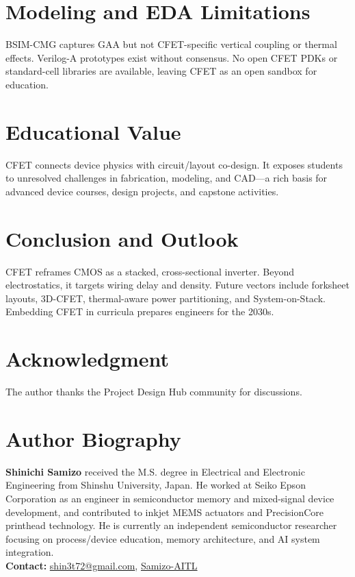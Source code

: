 \documentclass[conference]{IEEEtran}
\begin{document}
\section{Modeling and EDA Limitations}
BSIM-CMG captures GAA but not CFET-specific vertical coupling or thermal effects.
Verilog-A prototypes exist without consensus.
No open CFET PDKs or standard-cell libraries are available, leaving CFET as an open sandbox for education.\nocite{*}

\section{Educational Value}
CFET connects device physics with circuit/layout co-design.
It exposes students to unresolved challenges in fabrication, modeling, and CAD---a rich basis for advanced device courses, design projects, and capstone activities.

\section{Conclusion and Outlook}
CFET reframes CMOS as a stacked, cross-sectional inverter.
Beyond electrostatics, it targets wiring delay and density.
Future vectors include forksheet layouts, 3D-CFET, thermal-aware power partitioning, and System-on-Stack.
Embedding CFET in curricula prepares engineers for the 2030s.

\section*{Acknowledgment}
The author thanks the Project Design Hub community for discussions.




\section*{Author Biography}
\noindent\textbf{Shinichi Samizo}
received the M.S. degree in Electrical and Electronic Engineering from Shinshu University, Japan.
He worked at Seiko Epson Corporation as an engineer in semiconductor memory and mixed-signal device development, and contributed to inkjet MEMS actuators and PrecisionCore printhead technology.
He is currently an independent semiconductor researcher focusing on process/device education, memory architecture, and AI system integration.\\[2pt]
\textbf{Contact:} \href{mailto:shin3t72@gmail.com}{shin3t72@gmail.com}, \href{https://github.com/Samizo-AITL}{Samizo-AITL}
\end{document}
